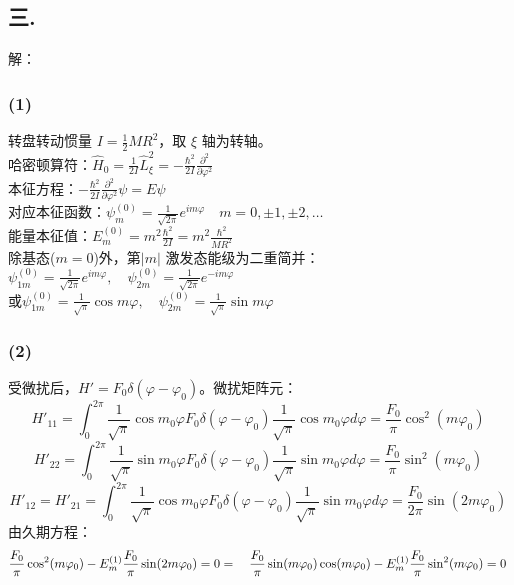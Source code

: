 \subsection{三.}
解：
\subsubsection{ (1)}转盘转动惯量 $I = \frac{1}{2}MR^2$，取 $\xi$ 轴为转轴。\\
 哈密顿算符：$\hat{H}_0 = \frac{1}{2I}\hat{L}_\xi^2 = -\frac{\hbar^2}{2I}\frac{\partial^2}{\partial\varphi^2}$\\
 本征方程：$-\frac{\hbar^2}{2I}\frac{\partial^2}{\partial\varphi^2}\psi = E\psi$\\
对应本征函数：$\psi_m^{(0)} = \frac{1}{\sqrt{2\pi}}e^{im\varphi} \quad  m = 0, \pm1, \pm2, \ldots $\\
能量本征值：$E_m^{(0)} = m^2\frac{\hbar^2}{2I} = m^2\frac{\hbar^2}{MR^2} $\\
除基态($m = 0$)外，第$\left|m\right|$ 激发态能级为二重简并：$\psi_{1m}^{(0)} = \frac{1}{\sqrt{2\pi}}e^{im\varphi}, \quad \psi_{2m}^{(0)} = \frac{1}{\sqrt{2\pi}}e^{-im\varphi}$\\
或$\psi_{1m}^{(0)} = \frac{1}{\sqrt{\pi}}\cos m\varphi, \quad \psi_{2m}^{(0)} = \frac{1}{\sqrt{\pi}}\sin m\varphi $
\subsubsection{(2)}
受微扰后，$H' = F_0 \delta(\varphi-\varphi_0)$。微扰矩阵元：
$$ H'_{11} = \int_0^{2\pi} \frac{1}{\sqrt{\pi}}\cos m_0 \varphi F_0 \delta(\varphi-\varphi_0)\frac{1}{\sqrt{\pi}}\cos m_0 \varphi d\varphi = \frac{F_0}{\pi} \cos^2(m\varphi_0)~$$
$$H'_{22} = \int_0^{2\pi} \frac{1}{\sqrt{\pi}}\sin m_0 \varphi F_0 \delta(\varphi-\varphi_0)\frac{1}{\sqrt{\pi}}\sin m_0 \varphi d\varphi = \frac{F_0}{\pi} \sin^2(m\varphi_0)~$$
$$H'_{12} = H'_{21} = \int_0^{2\pi} \frac{1}{\sqrt{\pi}}\cos m_0 \varphi F_0 \delta(\varphi-\varphi_0)\frac{1}{\sqrt{\pi}}\sin m_0 \varphi d\varphi = \frac{F_0}{2\pi} \sin(2m \varphi_0)~$$
由久期方程：$$\frac{F_0}{\pi} \cos^2(m\varphi_0) - E_m^{(1)} \frac{F_0}{\pi} \sin(2m\varphi_0) = 0 \\\\
= \quad \frac{F_0}{\pi} \sin(m\varphi_0) \cos(m\varphi_0) - E_m^{(1)} \frac{F_0}{\pi} \sin^2(m\varphi_0) = 0 ~$$
